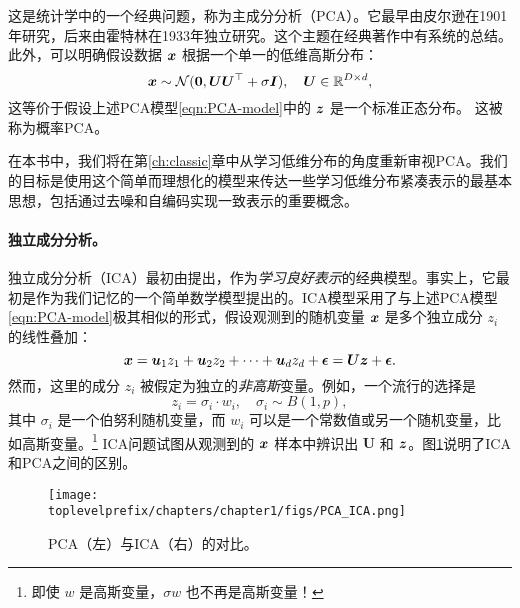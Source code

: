\documentclass[../../book-main.tex]{subfiles}
\begin{document}
这是统计学中的一个经典问题，称为主成分分析（PCA）。它最早由皮尔逊在1901年研究\cite{Pearson1901}，后来由霍特林在1933年独立研究\cite{Hotelling1933}。这个主题在经典著作\cite{Jolliffe1986,JolliffeI2002}中有系统的总结。
此外，可以明确假设数据 $\bm{x}$ 根据一个单一的低维高斯分布：
\begin{equation}
    \bm{x} \sim \mathcal{N}(\boldsymbol{0}, \boldsymbol{U}\boldsymbol{U}^\top + \sigma \bm{I}), \quad \boldsymbol{U} \in \mathbb{R}^{D\times d},
\end{equation}
这等价于假设上述PCA模型\eqref{eqn:PCA-model}中的 $\bm{z}$ 是一个标准正态分布。
这被称为概率PCA\cite{TippingM1999}。

在本书中，我们将在第\ref{ch:classic}章中从学习低维分布的角度重新审视PCA。我们的目标是使用这个简单而理想化的模型来传达一些学习低维分布紧凑表示的最基本思想，包括通过去噪和自编码实现一致表示的重要概念。

\paragraph{独立成分分析。}
独立成分分析（ICA）最初由\cite{Ans-1985}提出，作为{\em 学习良好表示}的经典模型。事实上，它最初是作为我们记忆的一个简单数学模型提出的。ICA模型采用了与上述PCA模型\eqref{eqn:PCA-model}极其相似的形式，假设观测到的随机变量 $\bm{x}$ 是多个独立成分 $z_i$ 的线性叠加：
\begin{equation}
    \bm{x} = \boldsymbol{u}_1 z_1 + \boldsymbol{u}_2 z_2 + \cdots + \boldsymbol{u}_d z_d  + \boldsymbol{\epsilon} =  \boldsymbol{U} \bm{z} + \boldsymbol{\epsilon}.
    \label{eqn:ICA-model}
\end{equation}
然而，这里的成分 $z_i$ 被假定为独立的{\em 非高斯}变量。例如，一个流行的选择是
\begin{equation}
    z_i = \sigma_i \cdot w_i, \quad \sigma_i \sim B(1,p),
    \label{eqn:ICA-modes}
\end{equation}
其中 $\sigma_i$ 是一个伯努利随机变量，而 $w_i$ 可以是一个常数值或另一个随机变量，比如高斯变量。\footnote{即使 $w$ 是高斯变量，$\sigma w$ 也不再是高斯变量！} ICA问题试图从观测到的 $\bm{x}$ 样本中辨识出 $\boldsymbol{U}$ 和 $\bm{z}$。图\ref{fig:ICA-PCA}说明了ICA和PCA之间的区别。

\begin{figure}
    \centering
    \texttt{[image: \\toplevelprefix/chapters/chapter1/figs/PCA\_ICA.png]}
    \caption{PCA（左）与ICA（右）的对比。}
    \label{fig:ICA-PCA}
\end{figure}
\end{document}
